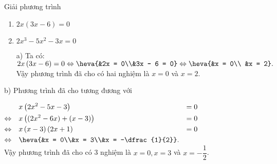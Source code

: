 \begin{ex}%
Giải phương trình
\hfill
    \begin{enumerate}
        \item $2x\left(3x - 6\right) = 0$
        \item $2x^3 - 5x^2 - 3x = 0$
    \end{enumerate}
\loigiai
    {
    \begin{enumerate}
        \item[a)] Ta có: $ 2x\left(3x - 6\right) = 0
        \Leftrightarrow \heva{&2x = 0\\&3x - 6 = 0}
        \Leftrightarrow  \heva{&x = 0\\ &x = 2}.$\\
        Vậy phương trình đã cho có hai nghiệm là $x = 0$ và $x = 2$.
    \end{enumerate}
        \item[b)] Phương trình đã cho tương đương với \smallskip
        
    $\begin{aligned}
       & x\left( 2x^2 - 5x - 3 \right) & = 0 \\
       \Leftrightarrow \quad & x\left( (2x^2 - 6x) + (x - 3)\right) & = 0\\
       \Leftrightarrow \quad & x\left(x - 3\right)\left(2x + 1\right) & = 0\\
       \Leftrightarrow \quad & \heva{&x = 0\\&x = 3\\&x = -\dfrac{1}{2}}.
        \end{aligned}$ \\
        Vậy phương trình đã cho có 3 nghiệm là $x = 0, x = 3$ và $x = -\dfrac{1}{2}$.
    }
\end{ex}

